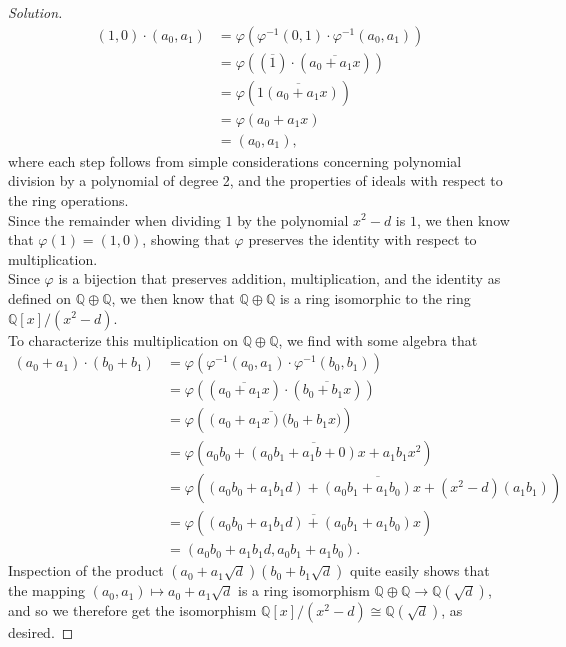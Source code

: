 \documentclass[12pt]{article}
\newenvironment{solution}
  {\renewcommand\qedsymbol{$\blacksquare$}\begin{proof}[Solution]}
{\end{proof}}
\theoremstyle{remark}
\begin{document}
\begin{solution}
  \begin{align*}
    (1,0)\cdot(a_0,a_1) 
    &= \varphi\left(\varphi^{-1}(0,1)\cdot\varphi^{-1}(a_0,a_1)\right) \\
    &= \varphi( (\overline{1})\cdot(\overline{a_0+a_1x}) ) \\
    &= \varphi(\overline{1(a_0+a_1x)}) \\
    &= \varphi(a_0+a_1x) \\
    &= (a_0,a_1),
  \end{align*}
  where each step follows from simple considerations concerning polynomial
  division by a polynomial of degree 2, and the properties of ideals
  with respect to the ring operations.\\
  \indent Since the remainder when dividing $1$ by the polynomial
  $x^2-d$ is $1$, we then know that $\varphi(1) = (1,0)$, showing that
  $\varphi$ preserves the identity with respect to multiplication.\\
  \indent Since $\varphi$ is a bijection that preserves addition,
  multiplication, and the identity as defined on $\mathbb{Q}\oplus\mathbb{Q}$,
  we then know that $\mathbb{Q}\oplus\mathbb{Q}$ is a ring isomorphic
  to the ring $\mathbb{Q}[x]/(x^2-d)$.\\
  \indent To characterize this multiplication on $\mathbb{Q}\oplus\mathbb{Q}$,
  we find with some algebra that
  \begin{align*}
    (a_0+a_1)\cdot(b_0+b_1)
    &= \varphi\left( 
         \varphi^{-1}(a_0,a_1)\cdot\varphi^{-1}(b_0,b_1) \right) \\
    &= \varphi\left( (\overline{a_0+a_1x})
         \cdot(\overline{b_0+b_1x}) \right)\\
    &= \varphi\left( \overline{(a_0+a_1x)(b_0+b_1x}) \right) \\
    &= \varphi(\overline{a_0b_0+(a_0b_1+a_1b+0)x+a_1b_1x^2})\\
    &= \varphi(
    \overline{(a_0b_0+a_1b_1d) + (a_0b_1+a_1b_0)x + (x^2-d)(a_1b_1)})\\
    &= \varphi(\overline{(a_0b_0+a_1b_1d) + (a_0b_1+a_1b_0)x})\\
    &= (a_0b_0+a_1b_1d, a_0b_1+a_1b_0).
  \end{align*}
  \indent Inspection of the product $(a_0+a_1\sqrt{d})(b_0+b_1\sqrt{d})$
  quite easily shows that the mapping $(a_0,a_1)\mapsto a_0+a_1\sqrt{d}$
  is a ring isomorphism $\mathbb{Q}\oplus\mathbb{Q}\to \mathbb{Q}(\sqrt{d})$,
  and so we therefore get the isomorphism 
  $\mathbb{Q}[x]/(x^2-d)\cong\mathbb{Q}(\sqrt{d})$, as desired.
\end{solution}
\end{document}

